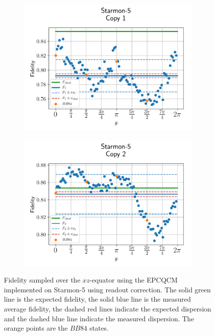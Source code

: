 \begin{figure}[H]
  \centering
  \begin{subfigure}{.5\textwidth}
    \centering
    \includegraphics[width=\textwidth]{Figures/Economical/Starmon/OnlyEquator/results_starmon_corrected_copy1.png}
    \label{fig:epc_corrected_starmon_equator_1}
  \end{subfigure}%
  \begin{subfigure}{.5\textwidth}
    \centering
    \includegraphics[width=\textwidth]{Figures/Economical/Starmon/OnlyEquator/results_starmon_corrected_copy2.png}
    \label{fig:epc_corrected_starmon_equator_2}
  \end{subfigure}
  \vspace{-0.5cm}
  \caption{Fidelity sampled over the $xz$-equator using the EPCQCM implemented on Starmon-5 using readout correction.
  The solid green line is the expected fidelity, the solid blue line is the measured average fidelity, the dashed red lines indicate the expected dispersion and the dashed blue line indicate the measured dispersion. The orange points are the $BB84$ states.}
  \label{fig:epc_corrected_starmon_equator}
\end{figure}

